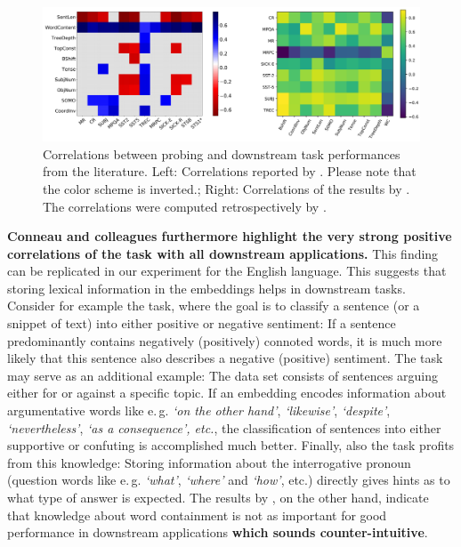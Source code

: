 \begin{figure}[h]
	\centering
	\includegraphics[scale=0.35]{images/corr_conneau_perone}
	\caption[Correlations between probing and downstream task performances from the literature]
		{Correlations between probing and downstream task performances from the literature.
		Left: Correlations reported by \citep{Conneau.2018a}. Please note that the color scheme is inverted.; 
		Right: Correlations of the results by \citep{Perone.2018}. The correlations were computed retrospectively by
		\citep{Eger.2019}.}
	\label{fig:corr_conneau_perone}
\end{figure}



\textbf{Conneau and colleagues furthermore highlight the very strong positive correlations of the  task with all downstream applications.} This finding can be replicated in our experiment for the English language. This suggests that storing lexical information in the embeddings helps in downstream tasks. Consider for example the  task, where the goal is to classify a sentence (or a snippet of text) into either positive or negative sentiment: If a sentence predominantly contains negatively (positively) connoted words, it is much more likely that this sentence also describes a negative (positive) sentiment. The  task may serve as an additional example: The data set consists of sentences arguing either for or against a specific topic. If an embedding encodes information about argumentative words like e.\,g. \textit{`on the other hand'}, \textit{`likewise'}, \textit{`despite'}, \textit{`nevertheless'}, \textit{`as a consequence', etc.}, the classification of sentences into either supportive or confuting is accomplished much better. Finally, also the  task profits from this knowledge: Storing information about the interrogative pronoun (question words like e.\,g. \textit{`what'}, \textit{`where'} and \textit{`how'}, etc.) directly gives hints as to what type of answer is expected. The results by \citep{Perone.2018}, on the other hand, indicate that knowledge about word containment is not as important for good performance in downstream applications \textbf{which sounds counter-intuitive}.

